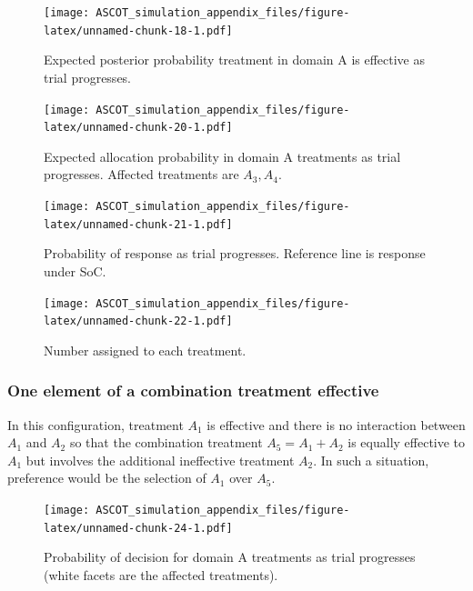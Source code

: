\documentclass[
]{article}
\begin{document}
\begin{figure}
\centering
\texttt{[image: ASCOT\_simulation\_appendix\_files/figure-latex/unnamed-chunk-18-1.pdf]}
\caption{\label{fig:unnamed-chunk-18}Expected posterior probability treatment in domain A is effective as trial progresses.}
\end{figure}

\begin{figure}
\centering
\texttt{[image: ASCOT\_simulation\_appendix\_files/figure-latex/unnamed-chunk-20-1.pdf]}
\caption{\label{fig:unnamed-chunk-20}Expected allocation probability in domain A treatments as trial progresses. Affected treatments are \(A_3, A_4\).}
\end{figure}

\begin{figure}
\centering
\texttt{[image: ASCOT\_simulation\_appendix\_files/figure-latex/unnamed-chunk-21-1.pdf]}
\caption{\label{fig:unnamed-chunk-21}Probability of response as trial progresses. Reference line is response under SoC.}
\end{figure}

\begin{figure}
\centering
\texttt{[image: ASCOT\_simulation\_appendix\_files/figure-latex/unnamed-chunk-22-1.pdf]}
\caption{\label{fig:unnamed-chunk-22}Number assigned to each treatment.}
\end{figure}

\clearpage

\hypertarget{one-element-of-a-combination-treatment-effective}{%
\subsubsection{One element of a combination treatment effective}\label{one-element-of-a-combination-treatment-effective}}

In this configuration, treatment \(A_1\) is effective and there is no interaction between \(A_1\) and \(A_2\) so that the combination treatment \(A_5=A_1+A_2\) is equally effective to \(A_1\) but involves the additional ineffective treatment \(A_2\).
In such a situation, preference would be the selection of \(A_1\) over \(A_5\).

\begin{figure}
\centering
\texttt{[image: ASCOT\_simulation\_appendix\_files/figure-latex/unnamed-chunk-24-1.pdf]}
\caption{\label{fig:unnamed-chunk-24}Probability of decision for domain A treatments as trial progresses (white facets are the affected treatments).}
\end{figure}
\end{document}
